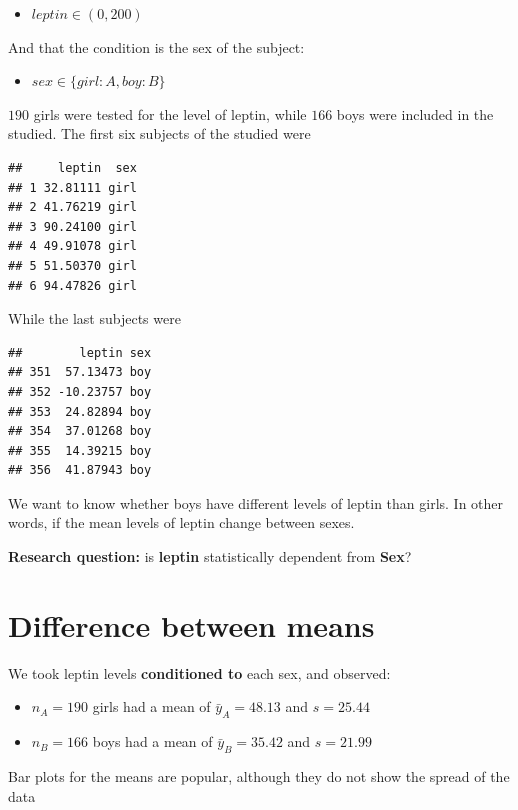 \documentclass[
]{book}
\providecommand{\tightlist}{%
  \setlength{\itemsep}{0pt}\setlength{\parskip}{0pt}}
\begin{document}
\begin{itemize}
\tightlist
\item
  \(leptin \in (0, 200)\)
\end{itemize}

And that the condition is the sex of the subject:

\begin{itemize}
\tightlist
\item
  \(sex \in \{girl:A,boy:B\}\)
\end{itemize}

\(190\) girls were tested for the level of leptin, while \(166\) boys were included in the studied. The first six subjects of the studied were

\begin{verbatim}
##     leptin  sex
## 1 32.81111 girl
## 2 41.76219 girl
## 3 90.24100 girl
## 4 49.91078 girl
## 5 51.50370 girl
## 6 94.47826 girl
\end{verbatim}

While the last subjects were

\begin{verbatim}
##        leptin sex
## 351  57.13473 boy
## 352 -10.23757 boy
## 353  24.82894 boy
## 354  37.01268 boy
## 355  14.39215 boy
## 356  41.87943 boy
\end{verbatim}

We want to know whether boys have different levels of leptin than girls. In other words, if the mean levels of leptin change between sexes.

\textbf{Research question:} is \textbf{leptin} statistically dependent from \textbf{Sex}?

\hypertarget{difference-between-means}{%
\section{Difference between means}\label{difference-between-means}}

We took leptin levels \textbf{conditioned to} each sex, and observed:

\begin{itemize}
\item
  \(n_A=190\) girls had a mean of \(\bar{y}_A=48.13\) and \(s= 25.44\)
\item
  \(n_B=166\) boys had a mean of \(\bar{y}_B=35.42\) and \(s=21.99\)
\end{itemize}

Bar plots for the means are popular, although they do not show the spread of the data
\end{document}
